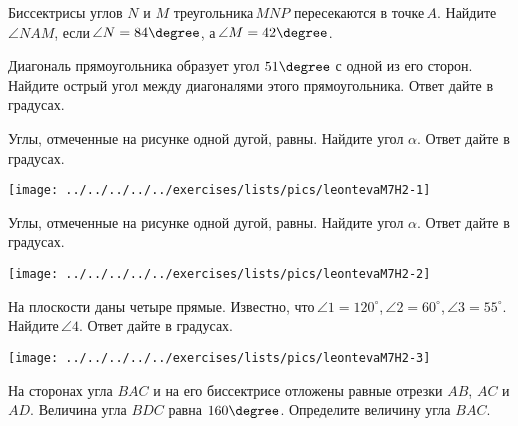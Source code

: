 \begin{class}[number=4]
	\begin{listofex}
		\item Биссектрисы углов \( N \) и \( M \) треугольника \( MNP \) пересекаются в точке \( A \). Найдите \( \angle NAM \), если \( \angle N=84\degree \), а \( \angle M=42\degree \).
		\item Диагональ прямоугольника образует угол \( 51\degree \) с одной из его сторон. Найдите острый угол между диагоналями этого прямоугольника. Ответ дайте в градусах.
		\item
		\begin{minipage}[t]{\bodywidth}
			Углы, отмеченные на рисунке одной дугой, равны. Найдите угол \( \alpha \). Ответ дайте в градусах.
		\end{minipage}
		\hspace{0.02\linewidth}
		\begin{minipage}[t]{\picwidth}
			\texttt{[image: ../../../../../exercises/lists/pics/leontevaM7H2-1]}
		\end{minipage}
		\item
		\begin{minipage}[t]{\bodywidth}
			Углы, отмеченные на рисунке одной дугой, равны. Найдите угол \( \alpha \). Ответ дайте в градусах.
		\end{minipage}
		\hspace{0.02\linewidth}
		\begin{minipage}[t]{\picwidth}
			\texttt{[image: ../../../../../exercises/lists/pics/leontevaM7H2-2]}
		\end{minipage}
		\item 
		\begin{minipage}[t]{\bodywidth}
			На плоскости даны четыре прямые. Известно, что \( \angle 1 = 120^{\circ} \), \( \angle 2 = 60^{\circ} \), \( \angle 3 = 55^{\circ} \). Найдите \( \angle 4 \). Ответ дайте в градусах.
		\end{minipage}
		\hspace{0.02\linewidth}
		\begin{minipage}[t]{\picwidth}
			\texttt{[image: ../../../../../exercises/lists/pics/leontevaM7H2-3]}
		\end{minipage}		
		\item На сторонах угла \( BAC \) и на его биссектрисе отложены равные отрезки \( AB \), \( AC \) и \( AD \). Величина угла \( BDC \) равна \( 160\degree \). Определите величину угла \( BAC \).

\end{listofex}
\end{class}
